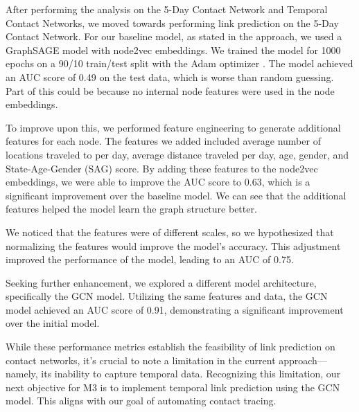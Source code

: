 \documentclass[times, 10pt,twocolumn]{article}
\begin{document}
After performing the analysis on the 5-Day Contact Network and Temporal Contact Networks, we moved towards performing link prediction on the 5-Day Contact Network. For our baseline model, as stated in the approach, we used a GraphSAGE model with node2vec embeddings. We trained the model for 1000 epochs on a 90/10 train/test split with the Adam optimizer \cite{kingma2017adam}. The model achieved an AUC score of 0.49 on the test data, which is worse than random guessing. Part of this could be because no internal node features were used in the node embeddings.

To improve upon this, we performed feature engineering to generate additional features for each node. The features we added included average number of locations traveled to per day, average distance traveled per day, age, gender, and State-Age-Gender (SAG) score. By adding these features to the node2vec embeddings, we were able to improve the AUC score to 0.63, which is a significant improvement over the baseline model. We can see that the additional features helped the model learn the graph structure better. 


We noticed that the features were of different scales, so we hypothesized that normalizing the features would improve the model's accuracy. This adjustment improved the performance of the model, leading to an AUC of 0.75.

Seeking further enhancement, we explored a different model architecture, specifically the GCN model. Utilizing the same features and data, the GCN model achieved an AUC score of 0.91, demonstrating a significant improvement over the initial model.


While these performance metrics establish the feasibility of link prediction on contact networks, it's crucial to note a limitation in the current approach—namely, its inability to capture temporal data. Recognizing this limitation, our next objective for M3 is to implement temporal link prediction using the GCN model. This aligns with our goal of automating contact tracing.
\end{document}
